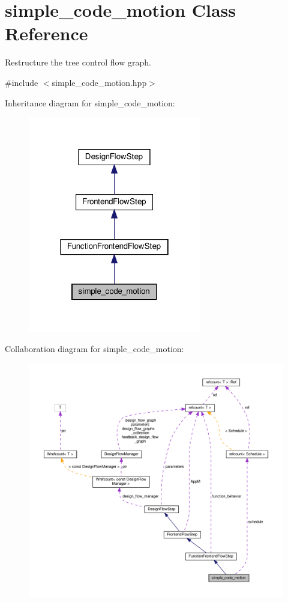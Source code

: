 \hypertarget{classsimple__code__motion}{}\section{simple\+\_\+code\+\_\+motion Class Reference}
\label{classsimple__code__motion}


Restructure the tree control flow graph.  




{\ttfamily \#include $<$simple\+\_\+code\+\_\+motion.\+hpp$>$}



Inheritance diagram for simple\+\_\+code\+\_\+motion\+:
\nopagebreak
\begin{figure}[H]
\begin{center}
\leavevmode
\includegraphics[width=214pt]{d3/d64/classsimple__code__motion__inherit__graph}
\end{center}
\end{figure}


Collaboration diagram for simple\+\_\+code\+\_\+motion\+:
\nopagebreak
\begin{figure}[H]
\begin{center}
\leavevmode
\includegraphics[width=350pt]{d1/db2/classsimple__code__motion__coll__graph}
\end{center}
\end{figure}

